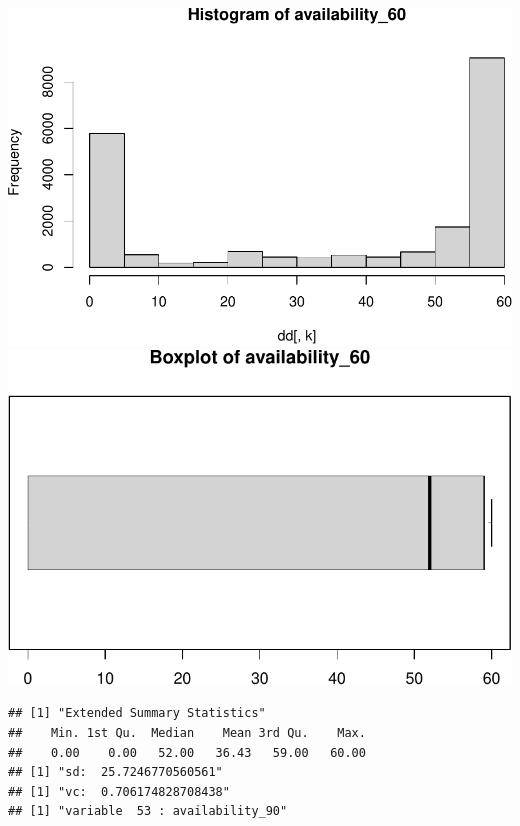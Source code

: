 \includegraphics{anal_files/figure-latex/unnamed-chunk-7-34.pdf}
\includegraphics{anal_files/figure-latex/unnamed-chunk-7-35.pdf}

\begin{verbatim}
## [1] "Extended Summary Statistics"
##    Min. 1st Qu.  Median    Mean 3rd Qu.    Max. 
##    0.00    0.00   52.00   36.43   59.00   60.00 
## [1] "sd:  25.7246770560561"
## [1] "vc:  0.706174828708438"
## [1] "variable  53 : availability_90"
\end{verbatim}

